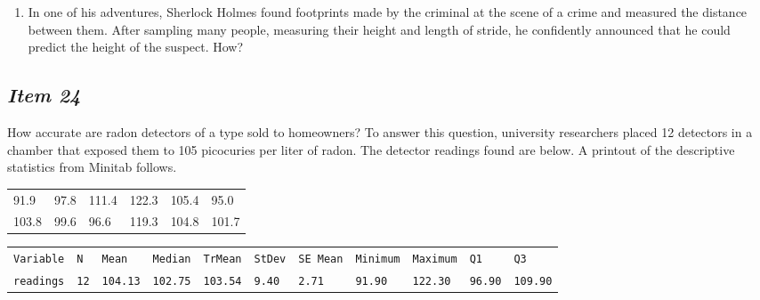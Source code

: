 \documentclass[twoside,openany]{tufte-book}
\begin{document}
\begin{enumerate}[leftmargin=1cm, itemsep=.2em]
\bigskip	
\item In one of his adventures, Sherlock Holmes found footprints made by the criminal at the scene of a crime and measured the distance between them. After sampling many people, measuring their height and length of stride, he confidently announced that he could predict the height of the suspect. How?
\end{enumerate}

\newpage

\subsection{\textbf{\textit{Item 24}}}
How accurate are radon detectors of a type sold to homeowners?  To answer this question, university researchers placed 12 detectors in a chamber that exposed them to 105 picocuries per liter of radon.  The detector readings found are below.  A printout of the descriptive statistics from Minitab follows. 

\begin{table}[!ht]
\begin{center}
\begin{tabular}{llllll}
91.9	& 97.8 & 111.4 & 122.3 & 105.4 & 95.0\\
103.8 & 99.6 & 96.6 & 119.3 & 104.8 & 101.7\\
\end{tabular}
\end{center}
\end{table}

\begin{table}[!ht]
\begin{center}
\begin{tabular}{lllllllllll}
\texttt{Variable} & \texttt{N} & \texttt{Mean} & \texttt{Median} &    \texttt{TrMean} & \texttt{StDev} & \texttt{SE Mean} & \texttt{Minimum}  & \texttt{Maximum}      &   \texttt{Q1}   &      \texttt{Q3}\\
\texttt{readings} & \texttt{12} & \texttt{104.13} & \texttt{102.75} & \texttt{103.54} & \texttt{9.40} & \texttt{2.71} &      \texttt{91.90}  &  \texttt{122.30}   &   \texttt{96.90}   &  \texttt{109.90}\\
\end{tabular}
\end{center}
\end{table}

\renewcommand{\labelenumi}{\arabic{enumi}.}
\end{document}
